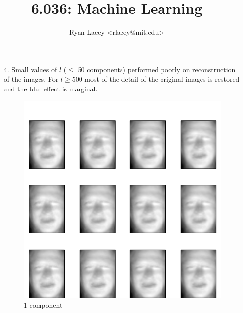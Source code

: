 \documentclass{article}
\begin{document}

\title{6.036: Machine Learning}
\author{
  Ryan Lacey <rlacey@mit.edu>\\
}
        
\maketitle
        

\begin{enumerate}
\item[4.]
	Small values of $l$ ($\le$ 50 components) performed poorly on reconstruction of the images. For $l \ge 500$ most of the detail of the original images is restored and the blur effect is marginal.\\
	
	\begin{figure}[!htb]
	  \includegraphics[width=\linewidth]{../images/reconstructed1.png}
	  \caption{1 component}
	\endminipage\hfill

\end{figure}
\end{enumerate}
\end{document}
